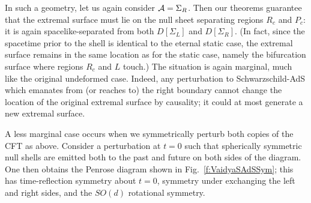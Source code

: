 \documentclass[12pt]{article}
\def\regA{{\cal A}}
\def\SAdS#1{Schwarzschild-AdS$_{#1}$}
\begin{document}
In such a geometry, let us again consider $\regA = \Sigma_R$. Then our theorems guarantee that the extremal surface must lie on the null sheet separating regions $R_c$ and $P_c$: it is again spacelike-separated from both $D[\Sigma_L]$ and $D[\Sigma_R]$. (In fact, since the spacetime prior to the shell is identical to the eternal static case, the extremal surface remains in the same location as for the static case, namely the bifurcation surface where regions $R_c$ and $L$ touch.) The situation is again marginal, much like the original undeformed case.  Indeed, any perturbation to \SAdS{} which emanates from (or reaches to) the right boundary cannot change the location of the original extremal surface by causality; it could at most generate a new extremal surface.

A less marginal case occurs when we symmetrically perturb both copies of the CFT as above.  Consider a perturbation at $t = 0$ such that spherically symmetric null shells are emitted both to the past and future on both sides of the diagram.  One then obtains the Penrose diagram shown in Fig.~\ref{f:VaidyaSAdSSym}; this has time-reflection symmetry about $t=0$, symmetry under exchanging the left and right sides, and the $SO(d)$ 
rotational symmetry.
\end{document}
